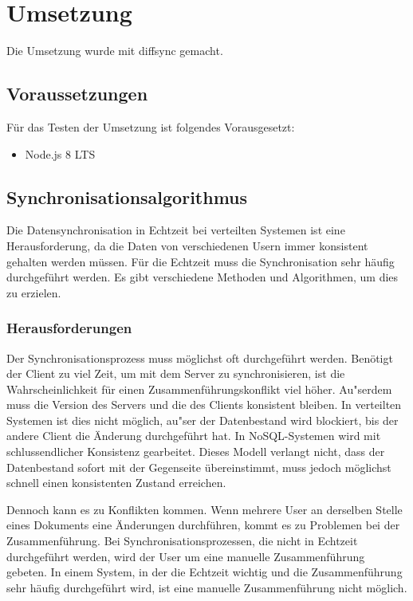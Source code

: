 
\section{Umsetzung}
Die Umsetzung wurde mit diffsync gemacht.

\subsection{Voraussetzungen}

Für das Testen der Umsetzung ist folgendes Vorausgesetzt:
\begin{itemize}
	\item Node.js 8 LTS
\end{itemize}


\subsection{Synchronisationsalgorithmus}
Die Datensynchronisation in Echtzeit bei verteilten Systemen ist eine Herausforderung, da die Daten von verschiedenen Usern immer konsistent gehalten werden müssen. Für die Echtzeit muss die Synchronisation sehr häufig durchgeführt werden. Es gibt verschiedene Methoden und Algorithmen, um dies zu erzielen.

\subsubsection{Herausforderungen}

Der Synchronisationsprozess muss möglichst oft durchgeführt werden. Benötigt der Client zu viel Zeit, um mit dem Server zu synchronisieren, ist die Wahrscheinlichkeit für einen Zusammenführungskonflikt viel höher. Au"serdem muss die Version des Servers und die des Clients konsistent bleiben. In verteilten Systemen ist dies nicht möglich, au"ser der Datenbestand wird blockiert, bis der andere Client die Änderung durchgeführt hat. In NoSQL-Systemen wird mit schlussendlicher Konsistenz gearbeitet. Dieses Modell verlangt nicht, dass der Datenbestand sofort mit der Gegenseite übereinstimmt, muss jedoch möglichst schnell einen konsistenten Zustand erreichen. \cite{websocket-consistency-tanenbaum}

Dennoch kann es zu Konflikten kommen. Wenn mehrere User an derselben Stelle eines Dokuments eine Änderungen durchführen, kommt es zu Problemen bei der Zusammenführung. Bei Synchronisationsprozessen, die nicht in Echtzeit durchgeführt werden, wird der User um eine manuelle Zusammenführung gebeten. In einem System, in der die Echtzeit wichtig und die Zusammenführung sehr häufig durchgeführt wird, ist eine manuelle Zusammenführung nicht möglich.

